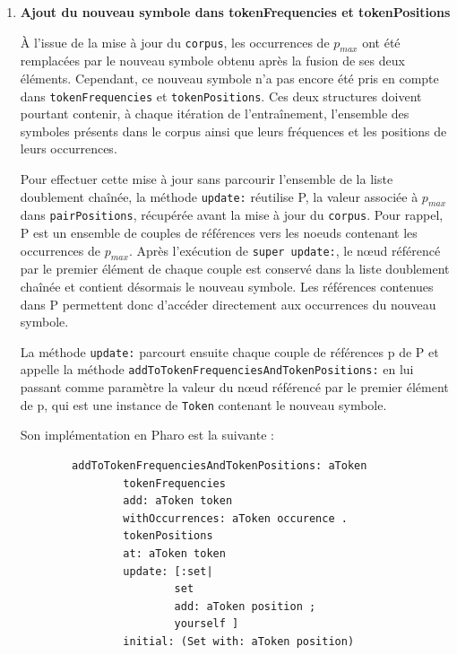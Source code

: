 \documentclass[12pt,a4paper]{report}
\begin{document}
\begin{enumerate}
\begin{enumerate}[label=\alph*)]
	 	Son implémentation dans Pharo est la suivante :
	 	
	 	\begin{verbatim}
	 	updatePairsScoresFrom: pair
	 			(pairFrequencies occurrencesOf: pair) = 0
	 					ifTrue: [
	 							pairScores
	 							removeKey: pair
	 							ifAbsent:[] ]
	 					ifFalse: [
	 							pairScores
	 							at: pair
	 							put: (pairFrequencies occurrencesOf: pair )
	 							/((tokenFrequencies occurrencesOf: pair first)
	 							* (tokenFrequencies occurrencesOf: pair second )) asFloat] .
	 	\end{verbatim}
	 	
	 	\item \textbf{Ajout du nouveau symbole dans tokenFrequencies et tokenPositions}
	 	
	 	À l'issue de la mise à jour du \texttt{corpus}, les occurrences de $p_{max}$ ont été remplacées par le nouveau symbole obtenu après la fusion de ses deux éléments. Cependant, ce nouveau symbole n'a pas encore été pris en compte dans \texttt{tokenFrequencies} et \texttt{tokenPositions}. Ces deux structures doivent pourtant contenir, à chaque itération de l'entraînement, l'ensemble des symboles présents dans le corpus ainsi que leurs fréquences et les positions de leurs occurrences.
	 	
	 	Pour effectuer cette mise à jour sans parcourir l'ensemble de la liste doublement chaînée, la méthode \texttt{update:} réutilise P, la valeur associée à $p_{max}$ dans \texttt{pairPositions}, récupérée avant la mise à jour du \texttt{corpus}. Pour rappel, P est un ensemble de couples de références vers les noeuds contenant les occurrences de $p_{max}$. Après l'exécution de \texttt{super update:}, le nœud référencé par le premier élément de chaque couple est conservé dans la liste doublement chaînée et contient désormais le nouveau symbole. Les références contenues dans P permettent donc d'accéder directement aux occurrences du nouveau symbole.
	 	
	 	La méthode \texttt{update:} parcourt ensuite chaque couple de références p de P et appelle la méthode \texttt{addToTokenFrequenciesAndTokenPositions:} en lui passant comme paramètre la valeur du nœud référencé par le premier élément de p, qui est une instance de \texttt{Token} contenant le nouveau symbole.
	 	
	 	Son implémentation en Pharo est la suivante :
	 	
	 	\begin{verbatim}
	 	addToTokenFrequenciesAndTokenPositions: aToken
	 			tokenFrequencies
	 			add: aToken token
	 			withOccurrences: aToken occurence .
	 			tokenPositions
	 			at: aToken token
	 			update: [:set|
	 					set
	 					add: aToken position ;
	 					yourself ]
	 			initial: (Set with: aToken position)
	 	\end{verbatim}
	 	

\end{enumerate}
\end{enumerate}
\end{document}

